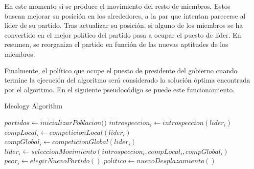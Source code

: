 En este momento sí se produce el movimiento del resto de miembros. Estos buscan mejorar su posición en los alrededores, a la par que intentan parecerse al líder de su partido. Tras actualizar su posición, si alguno de los miembros se ha convertido en el mejor político del partido pasa a ocupar el puesto de líder. En resumen, se reorganiza el partido en función de las nuevas aptitudes de los miembros.

Finalmente, el político que ocupe el puesto de presidente del gobierno cuando termine la ejecución del algoritmo será considerado la solución óptima encontrada por el algoritmo. En el siguiente pseudocódigo se puede este funcionamiento.

\begin{algorithm}
	\caption{Ideology Algorithm}
	\begin{algorithmic}[1]
		\State $partidos \gets \textit{inicializarPoblacion()}$
		\State $introspeccion_i \gets introspeccion(lider_i)$
		\State $compLocal_i \gets competicionLocal(lider_i)$
		\State $compGlobal_i \gets competicionGlobal(lider_i)$
		\State $lider_i \gets seleccionMovimiento(introspeccion_i, compLocal_i, compGlobal_i)$
		\State $peor_i \gets elegirNuevoPartido()$
		\EndIf
		\State $politico \gets nuevoDesplazamiento()$
		\EndFor
		\EndWhile
	\end{algorithmic}
\end{algorithm}